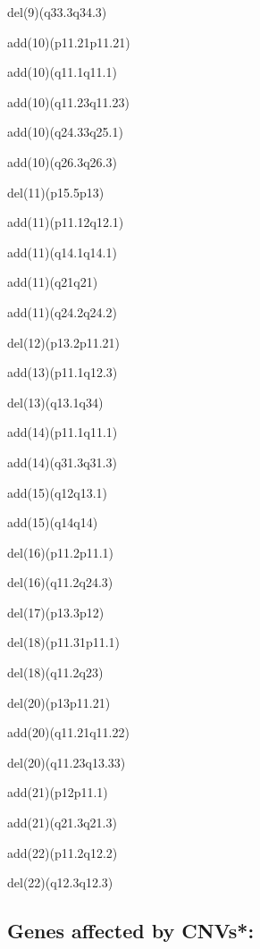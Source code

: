 \documentclass[]{article}
\begin{document}
del(9)(q33.3q34.3)

add(10)(p11.21p11.21)

add(10)(q11.1q11.1)

add(10)(q11.23q11.23)

add(10)(q24.33q25.1)

add(10)(q26.3q26.3)

del(11)(p15.5p13)

add(11)(p11.12q12.1)

add(11)(q14.1q14.1)

add(11)(q21q21)

add(11)(q24.2q24.2)

del(12)(p13.2p11.21)

add(13)(p11.1q12.3)

del(13)(q13.1q34)

add(14)(p11.1q11.1)

add(14)(q31.3q31.3)

add(15)(q12q13.1)

add(15)(q14q14)

del(16)(p11.2p11.1)

del(16)(q11.2q24.3)

del(17)(p13.3p12)

del(18)(p11.31p11.1)

del(18)(q11.2q23)

del(20)(p13p11.21)

add(20)(q11.21q11.22)

del(20)(q11.23q13.33)

add(21)(p12p11.1)

add(21)(q21.3q21.3)

add(22)(p11.2q12.2)

del(22)(q12.3q12.3)

\hypertarget{genes-affected-by-cnvs}{%
\subsection{Genes affected by CNVs*:}\label{genes-affected-by-cnvs}}
\end{document}
